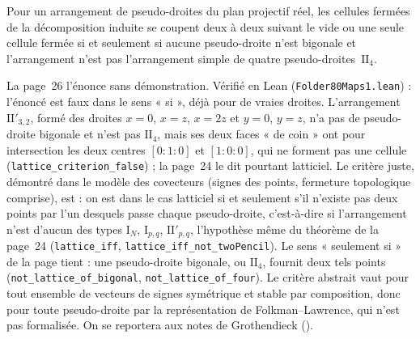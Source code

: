 \begin{encadre}
\begin{theoreme*}\nonverifie
Pour un arrangement de pseudo-droites du plan projectif réel, les cellules fermées de la décomposition induite se coupent deux à deux suivant le vide ou une seule cellule fermée si et seulement si aucune pseudo-droite n'est bigonale et l'arrangement n'est pas l'arrangement simple de quatre pseudo-droites~$\mathrm{II}_4$.
\end{theoreme*}
\end{encadre}
{\small La page~26 l'énonce sans démonstration. Vérifié en Lean (\texttt{Folder80Maps1.lean}) : l'énoncé est faux dans le sens « si », déjà pour de vraies droites. L'arrangement $\mathrm{II}'_{3,2}$, formé des droites $x = 0$, $x = z$, $x = 2z$ et $y = 0$, $y = z$, n'a pas de pseudo-droite bigonale et n'est pas $\mathrm{II}_4$, mais ses deux faces « de coin » ont pour intersection les deux centres $[0 : 1 : 0]$ et $[1 : 0 : 0]$, qui ne forment pas une cellule (\texttt{lattice\_criterion\_false}) ; la page~24 le dit pourtant latticiel. Le critère juste, démontré dans le modèle des covecteurs (signes des points, fermeture topologique comprise), est : on est dans le cas latticiel si et seulement s'il n'existe pas deux points par l'un desquels passe chaque pseudo-droite, c'est-à-dire si l'arrangement n'est d'aucun des types $\mathrm{I}_N$, $\mathrm{I}_{p,q}$, $\mathrm{II}'_{p,q}$, l'hypothèse même du théorème de la page~24 (\texttt{lattice\_iff}, \texttt{lattice\_iff\_not\_twoPencil}). Le sens « seulement si » de la page tient : une pseudo-droite bigonale, ou $\mathrm{II}_4$, fournit deux tels points (\texttt{not\_lattice\_of\_bigonal}, \texttt{not\_lattice\_of\_four}). Le critère abstrait vaut pour tout ensemble de vecteurs de signes symétrique et stable par composition, donc pour toute pseudo-droite par la représentation de Folkman--Lawrence, qui n'est pas formalisée. On se reportera aux notes de Grothendieck ().\par}

